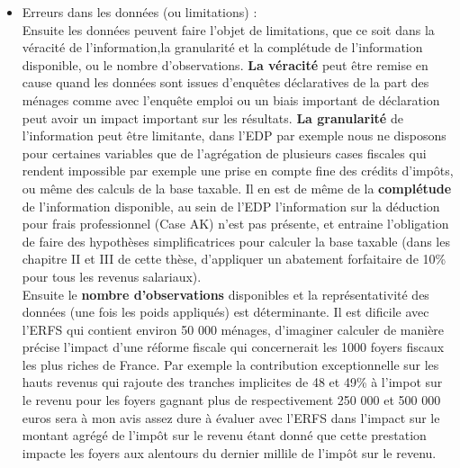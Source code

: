 \begin{itemize}
\tightlist
\item
  Erreurs dans les données (ou limitations) :\\
  Ensuite les données peuvent faire l'objet de limitations, que ce soit
  dans la véracité de l'information,la granularité et la complétude de
  l'information disponible, ou le nombre d'observations. \textbf{La
  véracité} peut être remise en cause quand les données sont issues
  d'enquêtes déclaratives de la part des ménages comme avec l'enquête
  emploi ou un biais important de déclaration peut avoir un impact
  important sur les résultats. \textbf{La granularité} de l'information
  peut être limitante, dans l'EDP par exemple nous ne disposons pour
  certaines variables que de l'agrégation de plusieurs cases fiscales
  qui rendent impossible par exemple une prise en compte fine des
  crédits d'impôts, ou même des calculs de la base taxable. Il en est de
  même de la \textbf{complétude} de l'information disponible, au sein de
  l'EDP l'information sur la déduction pour frais professionnel (Case
  AK) n'est pas présente, et entraine l'obligation de faire des
  hypothèses simplificatrices pour calculer la base taxable (dans les
  chapitre II et III de cette thèse, d'appliquer un abatement
  forfaitaire de 10\% pour tous les revenus salariaux).\\
  Ensuite le \textbf{nombre d'observations} disponibles et la
  représentativité des données (une fois les poids appliqués) est
  déterminante. Il est dificile avec l'ERFS qui contient environ 50 000
  ménages, d'imaginer calculer de manière précise l'impact d'une réforme
  fiscale qui concernerait les 1000 foyers fiscaux les plus riches de
  France. Par exemple la contribution exceptionnelle sur les hauts
  revenus qui rajoute des tranches implicites de 48 et 49\% à l'impot
  sur le revenu pour les foyers gagnant plus de respectivement 250 000
  et 500 000 euros sera à mon avis assez dure à évaluer avec l'ERFS dans
  l'impact sur le montant agrégé de l'impôt sur le revenu étant donné
  que cette prestation impacte les foyers aux alentours du dernier
  millile de l'impôt sur le revenu.
\end{itemize}

